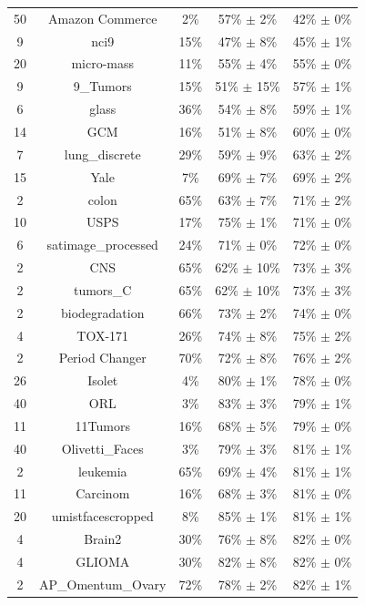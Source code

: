 \documentclass[preprint,12pt,authoryear]{elsarticle}
\begin{document}
{\begin{longtable}{|c|c|c|c|c|}
\hline
\endlastfoot

50 & Amazon Commerce & 2\% & 57\% $\pm$ 2\% & 42\% $\pm$ 0\% \\
9 & nci9 & 15\% & 47\% $\pm$ 8\% & 45\% $\pm$ 1\% \\
20 & micro-mass & 11\% & 55\% $\pm$ 4\% & 55\% $\pm$ 0\% \\
9 & 9\_Tumors & 15\% & 51\% $\pm$ 15\% & 57\% $\pm$ 1\% \\
6 & glass & 36\% & 54\% $\pm$ 8\% & 59\% $\pm$ 1\% \\
14 & GCM & 16\% & 51\% $\pm$ 8\% & 60\% $\pm$ 0\% \\
7 & lung\_discrete & 29\% & 59\% $\pm$ 9\% & 63\% $\pm$ 2\% \\
15 & Yale & 7\% & 69\% $\pm$ 7\% & 69\% $\pm$ 2\% \\
2 & colon & 65\% & 63\% $\pm$ 7\% & 71\% $\pm$ 2\% \\
10 & USPS & 17\% & 75\% $\pm$ 1\% & 71\% $\pm$ 0\% \\
6 & satimage\_processed & 24\% & 71\% $\pm$ 0\% & 72\% $\pm$ 0\% \\
2 & CNS & 65\% & 62\% $\pm$ 10\% & 73\% $\pm$ 3\% \\
2 & tumors\_C & 65\% & 62\% $\pm$ 10\% & 73\% $\pm$ 3\% \\
2 & biodegradation & 66\% & 73\% $\pm$ 2\% & 74\% $\pm$ 0\% \\
4 & TOX-171 & 26\% & 74\% $\pm$ 8\% & 75\% $\pm$ 2\% \\
2 & Period Changer & 70\% & 72\% $\pm$ 8\% & 76\% $\pm$ 2\% \\
26 & Isolet & 4\% & 80\% $\pm$ 1\% & 78\% $\pm$ 0\% \\
40 & ORL & 3\% & 83\% $\pm$ 3\% & 79\% $\pm$ 1\% \\
11 & 11Tumors & 16\% & 68\% $\pm$ 5\% & 79\% $\pm$ 0\% \\
40 & Olivetti\_Faces & 3\% & 79\% $\pm$ 3\% & 81\% $\pm$ 1\% \\
2 & leukemia & 65\% & 69\% $\pm$ 4\% & 81\% $\pm$ 1\% \\
11 & Carcinom & 16\% & 68\% $\pm$ 3\% & 81\% $\pm$ 0\% \\
20 & umistfacescropped & 8\% & 85\% $\pm$ 1\% & 81\% $\pm$ 1\% \\
4 & Brain2 & 30\% & 76\% $\pm$ 8\% & 82\% $\pm$ 0\% \\
4 & GLIOMA & 30\% & 82\% $\pm$ 8\% & 82\% $\pm$ 0\% \\
2 & AP\_Omentum\_Ovary & 72\% & 78\% $\pm$ 2\% & 82\% $\pm$ 1\% \\

\end{longtable}}
\end{document}
